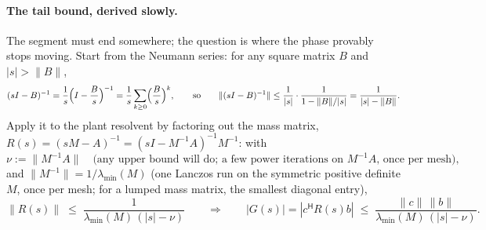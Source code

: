 \documentclass[11pt,a4paper]{article}
\newcommand{\hp}{^{\mathsf H}}
\begin{document}
{\paragraph{The tail bound, derived slowly.}
The segment must end somewhere; the question is where the phase provably stops moving.
Start from the Neumann series: for any square matrix $B$ and $|s|>\|B\|$,
\[
(sI-B)^{-1}=\frac1s\Bigl(I-\frac Bs\Bigr)^{-1}=\frac1s\sum_{k\ge0}\Bigl(\frac Bs\Bigr)^{k},
\qquad\text{so}\qquad
\|(sI-B)^{-1}\|\le\frac1{|s|}\cdot\frac1{1-\|B\|/|s|}=\frac1{|s|-\|B\|}.
\]
Apply it to the plant resolvent by factoring out the mass matrix,
$R(s)=(sM-A)^{-1}=(sI-M^{-1}A)^{-1}M^{-1}$: with
\[
\nu:=\|M^{-1}A\|
\quad\text{(any upper bound will do; a few power iterations on $M^{-1}A$, once per mesh)},
\]
and $\|M^{-1}\|=1/\lambda_{\min}(M)$
\quad(one Lanczos run on the symmetric positive definite $M$, once per mesh; for a lumped
mass matrix, the smallest diagonal entry),
\[
\|R(s)\|\;\le\;\frac{1}{\lambda_{\min}(M)\,(|s|-\nu)}
\qquad\Longrightarrow\qquad
|G(s)|=|c\hp R(s)b|\;\le\;\frac{\|c\|\,\|b\|}{\lambda_{\min}(M)\,(|s|-\nu)} .
\]

}
\end{document}
